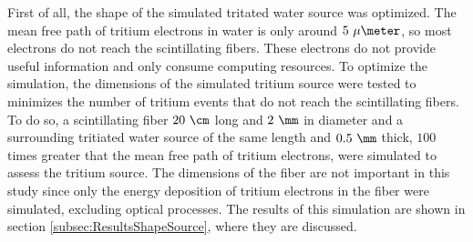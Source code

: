 First of all, the shape of the simulated tritated water source was optimized. The mean free path of tritium electrons in water is only around $5~\mu\meter$, so most electrons do not reach the scintillating fibers. These electrons do not provide useful information and only consume computing resources. To optimize the simulation, the dimensions of the simulated tritium source were tested to minimizes the number of tritium events that do not reach the scintillating fibers. To do so, a scintillating fiber $20~\cm$ long and $2~\mm$ in diameter and a surrounding tritiated water source of the same length and $0.5~\mm$ thick, $100$ times greater that the mean free path of tritium electrons, were simulated to assess the tritium source. The dimensions of the fiber are not important in this study since only the energy deposition of tritium electrons in the fiber were simulated, excluding optical processes. The results of this simulation are shown in section \ref{subsec:ResultsShapeSource}, where they are discussed.